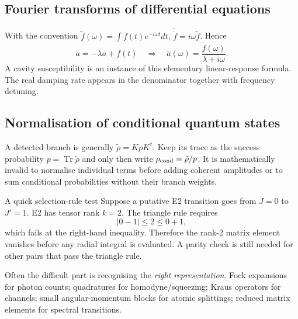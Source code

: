 \subsection{Fourier transforms of differential equations}
With the convention
\(\tilde f(\omega)=\int f(t)e^{-i\omega t}dt\),
\(\widetilde{\dot f}=i\omega\tilde f\).
Hence
\[
\dot a=-\lambda a+f(t)
\quad\Longrightarrow\quad
\boxed{\tilde a(\omega)=
\frac{\tilde f(\omega)}{\lambda+i\omega}}.
\]
A cavity susceptibility is an
instance of this elementary
linear-response formula.
The real damping rate appears
in the denominator together
with frequency detuning.

\subsection{Normalisation of conditional quantum states}
A detected branch is generally
\(\tilde\rho=K\rho K^\dagger\).
Keep its trace as the success
probability \(p=\operatorname{Tr}\tilde\rho\)
and only then write \(\rho_{\rm cond}=\tilde\rho/p\).
It is mathematically invalid to
normalise individual terms before
adding coherent amplitudes or
to sum conditional probabilities
without their branch weights.

\begin{worked}{A quick selection-rule test}
Suppose a putative E2 transition goes
from \(J=0\) to \(J'=1\).
E2 has tensor rank \(k=2\).
The triangle rule requires
\[
|0-1|\le2\le0+1,
\]
which fails at the right-hand inequality.
Therefore the rank-2 matrix element
vanishes before any radial integral
is evaluated. A parity check is
still needed for other pairs
that pass the triangle rule.
\end{worked}

\begin{checkpoint}
Often the difficult part is recognising
the \emph{right representation}.
Fock expansions for photon counts;
quadratures for homodyne/squeezing;
Kraus operators for channels;
small angular-momentum blocks for
atomic splittings; reduced matrix
elements for spectral transitions.
\end{checkpoint}
